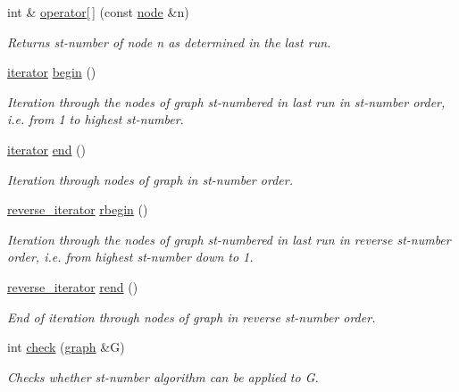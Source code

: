 \begin{DoxyCompactItemize}
int \& \mbox{\hyperlink{classst__number_a969162a10da5daba4219419d45c4be51}{operator\mbox{[}$\,$\mbox{]}}} (const \mbox{\hyperlink{classnode}{node}} \&n)
\begin{DoxyCompactList}\small\item\em Returns st-\/number of node {\ttfamily n} as determined in the last run. \end{DoxyCompactList}\item 
\mbox{\hyperlink{classst__number_a3aa3701636f69a567c5f6a676afafd39}{iterator}} \mbox{\hyperlink{classst__number_a1eddb2577b16109d22cde98a8ffde057}{begin}} ()
\begin{DoxyCompactList}\small\item\em Iteration through the nodes of graph st-\/numbered in last run in st-\/number order, i.\+e. from 1 to highest st-\/number. \end{DoxyCompactList}\item 
\mbox{\hyperlink{classst__number_a3aa3701636f69a567c5f6a676afafd39}{iterator}} \mbox{\hyperlink{classst__number_a3912b83a8cbddcb1fc804d20be528d52}{end}} ()
\begin{DoxyCompactList}\small\item\em Iteration through nodes of graph in st-\/number order. \end{DoxyCompactList}\item 
\mbox{\hyperlink{classst__number_a7db0e7ac82d781b75e1712c1fe5c055e}{reverse\+\_\+iterator}} \mbox{\hyperlink{classst__number_a56f2c67e9b49362947fe0c99278f6d31}{rbegin}} ()
\begin{DoxyCompactList}\small\item\em Iteration through the nodes of graph st-\/numbered in last run in reverse st-\/number order, i.\+e. from highest st-\/number down to 1. \end{DoxyCompactList}\item 
\mbox{\hyperlink{classst__number_a7db0e7ac82d781b75e1712c1fe5c055e}{reverse\+\_\+iterator}} \mbox{\hyperlink{classst__number_a4c5fdce6ab2be7ee9ddbb09e8d5c8560}{rend}} ()
\begin{DoxyCompactList}\small\item\em End of iteration through nodes of graph in reverse st-\/number order. \end{DoxyCompactList}\item 
int \mbox{\hyperlink{classst__number_a2aad4550b821c52d6998bff35fd8648f}{check}} (\mbox{\hyperlink{classgraph}{graph}} \&G)
\begin{DoxyCompactList}\small\item\em Checks whether st-\/number algorithm can be applied to {\ttfamily G}. \end{DoxyCompactList}\item 

\end{DoxyCompactItemize}
